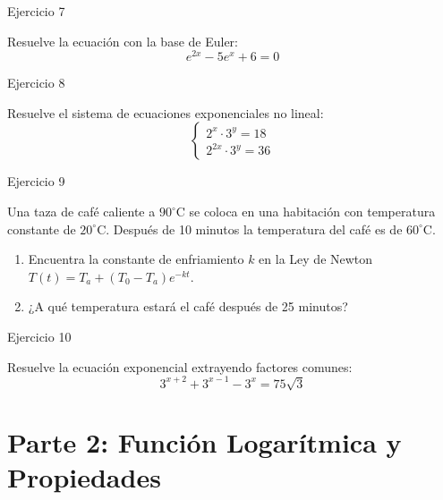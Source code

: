 \documentclass[aspectratio=169]{beamer}
\begin{document}
\begin{frame}{Ejercicio 7}
  \begin{mwejercicio}
    Resuelve la ecuación con la base de Euler:
    $$e^{2x} - 5e^x + 6 = 0$$
  \end{mwejercicio}
  \vspace{3.5cm}
\end{frame}
\begin{frame}{Ejercicio 8}
  \begin{mwejercicio}
    Resuelve el sistema de ecuaciones exponenciales no lineal:
    $$\begin{cases}
      2^x \cdot 3^y = 18 \\
      2^{2x} \cdot 3^y = 36
    \end{cases}$$
  \end{mwejercicio}
  \vspace{3.5cm}
\end{frame}
\begin{frame}{Ejercicio 9}
  \begin{mwejercicio}
    Una taza de café caliente a $90^\circ\text{C}$ se coloca en una habitación con temperatura constante de $20^\circ\text{C}$. Después de 10 minutos la temperatura del café es de $60^\circ\text{C}$.
    \begin{enumerate}
      \item Encuentra la constante de enfriamiento $k$ en la Ley de Newton $T(t) = T_a + (T_0 - T_a)e^{-kt}$.
      \item ¿A qué temperatura estará el café después de 25 minutos?
    \end{enumerate}
  \end{mwejercicio}
  \vspace{2.5cm}
\end{frame}
\begin{frame}{Ejercicio 10}
  \begin{mwejercicio}
    Resuelve la ecuación exponencial extrayendo factores comunes:
    $$3^{x + 2} + 3^{x - 1} - 3^x = 75 \sqrt{3}$$
  \end{mwejercicio}
  \vspace{3.5cm}
\end{frame}


\section{Parte 2: Función Logarítmica y Propiedades}
\end{document}
